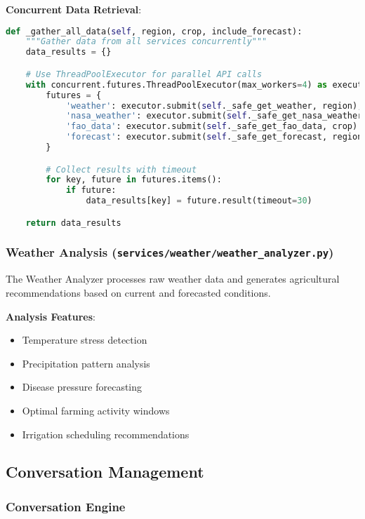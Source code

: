 \documentclass[12pt,a4paper]{article}
\begin{document}
\textbf{Concurrent Data Retrieval}:
\begin{lstlisting}[language=Python, caption=Concurrent API Calls]
def _gather_all_data(self, region, crop, include_forecast):
    """Gather data from all services concurrently"""
    data_results = {}

    # Use ThreadPoolExecutor for parallel API calls
    with concurrent.futures.ThreadPoolExecutor(max_workers=4) as executor:
        futures = {
            'weather': executor.submit(self._safe_get_weather, region),
            'nasa_weather': executor.submit(self._safe_get_nasa_weather, region),
            'fao_data': executor.submit(self._safe_get_fao_data, crop) if crop else None,
            'forecast': executor.submit(self._safe_get_forecast, region) if include_forecast else None
        }

        # Collect results with timeout
        for key, future in futures.items():
            if future:
                data_results[key] = future.result(timeout=30)

    return data_results
\end{lstlisting}

\subsubsection{Weather Analysis (\texttt{services/weather/weather\_analyzer.py})}

The Weather Analyzer processes raw weather data and generates agricultural recommendations based on current and forecasted conditions.

\textbf{Analysis Features}:
\begin{itemize}[leftmargin=*]
    \item Temperature stress detection
    \item Precipitation pattern analysis
    \item Disease pressure forecasting
    \item Optimal farming activity windows
    \item Irrigation scheduling recommendations
\end{itemize}

\subsection{Conversation Management}

\subsubsection{Conversation Engine}
\end{document}
